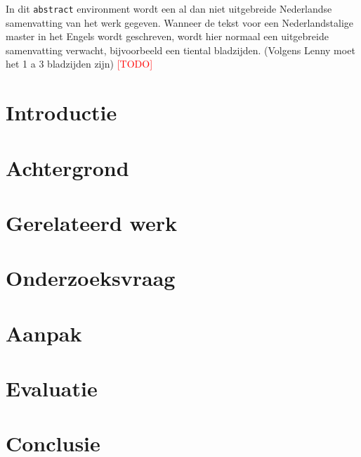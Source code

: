 \begin{abstract*}
  In dit \texttt{abstract} environment wordt een al dan niet uitgebreide
Nederlandse samenvatting van het werk gegeven.
Wanneer de tekst voor een Nederlandstalige master in het Engels wordt
geschreven, wordt hier normaal een uitgebreide samenvatting verwacht,
bijvoorbeeld een tiental bladzijden.  (Volgens Lenny moet het 1 a 3 bladzijden zijn)
\textcolor{red}{[TODO]}

\section{Introductie}
\section{Achtergrond}
\section{Gerelateerd werk}
\section{Onderzoeksvraag}
\section{Aanpak}
\section{Evaluatie}
\section{Conclusie}



\end{abstract*}